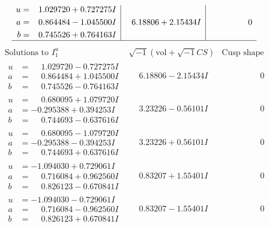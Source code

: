 \documentclass[1p]{elsarticle_modified}
\theoremstyle{definition}
\newcommand{\I}{\sqrt{-1}}
\begin{document}
$$\begin{array}{c|c|c}
\begin{aligned}
u &= \phantom{-}1.029720 + 0.727275 I \\
a &= \phantom{-}0.864484 - 1.045500 I \\
b &= \phantom{-}0.745526 + 0.764163 I\end{aligned}
 & \phantom{-}6.18806 + 2.15434 I & \phantom{-0.000000 } 0\\
 \hline 
 \end{array}$$\newpage$$\begin{array}{c|c|c}  
\text{Solutions to }I^u_{1}& \I (\text{vol} + \sqrt{-1}CS) & \text{Cusp shape}\\
 \hline 
\begin{aligned}
u &= \phantom{-}1.029720 - 0.727275 I \\
a &= \phantom{-}0.864484 + 1.045500 I \\
b &= \phantom{-}0.745526 - 0.764163 I\end{aligned}
 & \phantom{-}6.18806 - 2.15434 I & \phantom{-0.000000 } 0 \\ \hline\begin{aligned}
u &= \phantom{-}0.680095 + 1.079720 I \\
a &= -0.295388 + 0.394253 I \\
b &= \phantom{-}0.744693 - 0.637616 I\end{aligned}
 & \phantom{-}3.23226 - 0.56101 I & \phantom{-0.000000 } 0 \\ \hline\begin{aligned}
u &= \phantom{-}0.680095 - 1.079720 I \\
a &= -0.295388 - 0.394253 I \\
b &= \phantom{-}0.744693 + 0.637616 I\end{aligned}
 & \phantom{-}3.23226 + 0.56101 I & \phantom{-0.000000 } 0 \\ \hline\begin{aligned}
u &= -1.094030 + 0.729061 I \\
a &= \phantom{-}0.716084 + 0.962560 I \\
b &= \phantom{-}0.826123 - 0.670841 I\end{aligned}
 & \phantom{-}0.83207 + 1.55401 I & \phantom{-0.000000 } 0 \\ \hline\begin{aligned}
u &= -1.094030 - 0.729061 I \\
a &= \phantom{-}0.716084 - 0.962560 I \\
b &= \phantom{-}0.826123 + 0.670841 I\end{aligned}
 & \phantom{-}0.83207 - 1.55401 I & \phantom{-0.000000 } 0 \\ \hline\begin{aligned}

\end{aligned}
\end{array}$$
\end{document}
